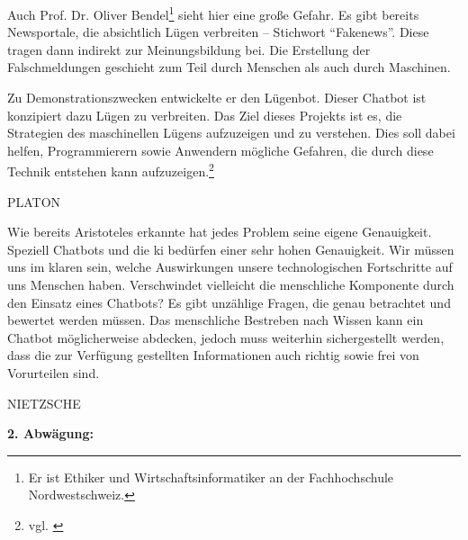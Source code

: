 Auch Prof. Dr. Oliver Bendel\footnote{Er ist Ethiker und Wirtschaftsinformatiker an der Fachhochschule Nordwestschweiz.} sieht hier eine große Gefahr. 
Es gibt bereits Newsportale, die absichtlich Lügen verbreiten -- Stichwort \enquote{Fakenews}. 
Diese tragen dann indirekt zur Meinungsbildung bei. 
Die Erstellung der Falschmeldungen geschieht zum Teil durch Menschen als auch durch Maschinen. 

Zu Demonstrationszwecken entwickelte er den Lügenbot. Dieser Chatbot ist konzipiert dazu Lügen zu verbreiten. 
Das Ziel dieses Projekts ist es, die Strategien des maschinellen Lügens aufzuzeigen und zu verstehen. 
Dies soll dabei helfen, Programmierern sowie Anwendern mögliche Gefahren, die durch diese Technik entstehen kann aufzuzeigen.\footnote{vgl. \cite{Bendel}} 

PLATON

Wie bereits Aristoteles erkannte hat jedes Problem seine eigene Genauigkeit. Speziell Chatbots und die \ac{ki} bedürfen einer sehr hohen Genauigkeit. Wir müssen uns im klaren sein, welche Auswirkungen unsere technologischen Fortschritte auf uns Menschen haben. Verschwindet vielleicht die menschliche Komponente durch den Einsatz eines Chatbots? 
Es gibt unzählige Fragen, die genau betrachtet und bewertet werden müssen. 
Das menschliche Bestreben nach Wissen kann ein Chatbot möglicherweise abdecken, jedoch muss weiterhin sichergestellt werden, dass die zur Verfügung gestellten Informationen auch richtig sowie frei von Vorurteilen sind.

NIETZSCHE



%

\textbf{2. Abwägung:}


